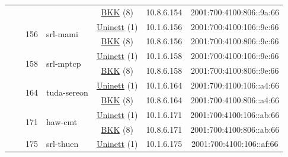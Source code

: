 \begin{small}
\begin{center}
\begin{longtable}{|c|c|c|c|c|c|c|c|}
  &  &  &  & \multicolumn{2}{|c|}{\tiny{\href{http://bkk.no}{BKK} (8)}} & \tiny{10.8.6.154} & \tiny{2001:700:4100:806::9a:66} \\* \cline{3-3}\cline{4-4}\cline{5-5}\cline{6-6}\cline{7-7}\cline{8-8}
  &  & \multirow{2}{*}{\tiny{156}} & \multicolumn{1}{|l|}{\multirow{2}{*}{\tiny{srl-mami}}} & \multicolumn{2}{|c|}{\tiny{\href{https://www.uninett.no}{Uninett} (1)}} & \tiny{10.1.6.156} & \tiny{2001:700:4100:106::9c:66} \\* \cline{5-5}\cline{6-6}\cline{7-7}\cline{8-8}
  &  &  &  & \multicolumn{2}{|c|}{\tiny{\href{http://bkk.no}{BKK} (8)}} & \tiny{10.8.6.156} & \tiny{2001:700:4100:806::9c:66} \\* \cline{3-3}\cline{4-4}\cline{5-5}\cline{6-6}\cline{7-7}\cline{8-8}
  &  & \multirow{2}{*}{\tiny{158}} & \multicolumn{1}{|l|}{\multirow{2}{*}{\tiny{srl-mptcp}}} & \multicolumn{2}{|c|}{\tiny{\href{https://www.uninett.no}{Uninett} (1)}} & \tiny{10.1.6.158} & \tiny{2001:700:4100:106::9e:66} \\* \cline{5-5}\cline{6-6}\cline{7-7}\cline{8-8}
  &  &  &  & \multicolumn{2}{|c|}{\tiny{\href{http://bkk.no}{BKK} (8)}} & \tiny{10.8.6.158} & \tiny{2001:700:4100:806::9e:66} \\* \cline{3-3}\cline{4-4}\cline{5-5}\cline{6-6}\cline{7-7}\cline{8-8}
  &  & \multirow{2}{*}{\tiny{164}} & \multicolumn{1}{|l|}{\multirow{2}{*}{\tiny{tuda-sereon}}} & \multicolumn{2}{|c|}{\tiny{\href{https://www.uninett.no}{Uninett} (1)}} & \tiny{10.1.6.164} & \tiny{2001:700:4100:106::a4:66} \\* \cline{5-5}\cline{6-6}\cline{7-7}\cline{8-8}
  &  &  &  & \multicolumn{2}{|c|}{\tiny{\href{http://bkk.no}{BKK} (8)}} & \tiny{10.8.6.164} & \tiny{2001:700:4100:806::a4:66} \\* \cline{3-3}\cline{4-4}\cline{5-5}\cline{6-6}\cline{7-7}\cline{8-8}
  &  & \multirow{2}{*}{\tiny{171}} & \multicolumn{1}{|l|}{\multirow{2}{*}{\tiny{haw-cmt}}} & \multicolumn{2}{|c|}{\tiny{\href{https://www.uninett.no}{Uninett} (1)}} & \tiny{10.1.6.171} & \tiny{2001:700:4100:106::ab:66} \\* \cline{5-5}\cline{6-6}\cline{7-7}\cline{8-8}
  &  &  &  & \multicolumn{2}{|c|}{\tiny{\href{http://bkk.no}{BKK} (8)}} & \tiny{10.8.6.171} & \tiny{2001:700:4100:806::ab:66} \\* \cline{3-3}\cline{4-4}\cline{5-5}\cline{6-6}\cline{7-7}\cline{8-8}
  &  & \multirow{2}{*}{\tiny{175}} & \multicolumn{1}{|l|}{\multirow{2}{*}{\tiny{srl-thuen}}} & \multicolumn{2}{|c|}{\tiny{\href{https://www.uninett.no}{Uninett} (1)}} & \tiny{10.1.6.175} & \tiny{2001:700:4100:106::af:66} \\* \cline{5-5}\cline{6-6}\cline{7-7}\cline{8-8}

\end{longtable}
\end{center}
\end{small}
